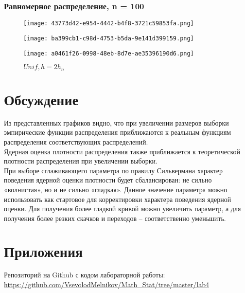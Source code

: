 \subsubsection{Равномерное распределение, n = 100}
\begin{figure}[!htb]
  \texttt{[image: 43773d42-e954-4442-b4f8-3721c59853fa.png]}
  \caption{\(Unif, h=h_n/2\)}
\endminipage\hfill
{}
  \texttt{[image: ba399cb1-c98d-4753-b5da-9e141d399159.png]}
  \caption{\(Unif, h=h_n\)}
\endminipage\hfill
{}
  \texttt{[image: a0461f26-0998-48eb-8d7e-ae35396190d6.png]}
  \caption{\(Unif, h=2h_n\)}
\endminipage
\label{fig:unif100}
\end{figure}
\newpage

\section{Обсуждение}
Из представленных графиков видно, что при увеличении размеров выборки эмпирические функции распределения приближаются к реальным функциям распределения соответствующих распределений.\\
Ядерная оценка плотности распределения также приближается к теоретической плотности распределения при увеличении выборки.\\
При выборе сглаживающего параметра по правилу Сильвермана характер поведения ядерной оценки плотности будет сбалансирован: не сильно «волнистая», но и не сильно «гладкая».  Данное значение параметра можно использовать как стартовое для корректировки характера поведения ядерной оценки. Для получения более гладкой кривой можно увеличить параметр, а для получения более резких скачков и переходов – соответственно уменьшить.

\section{Приложения}
Репозиторий на Github с кодом лабораторной работы:\\
\url{https://github.com/VsevolodMelnikov/Math_Stat/tree/master/lab4}


